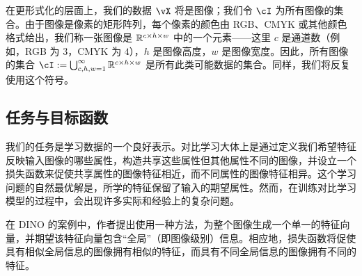 \documentclass[../../book-main.tex]{subfiles}
\begin{document}
在更形式化的层面上，我们的数据 \(\vX\) 将是图像；我们令 \(\cI\) 为所有图像的集合。由于图像是像素的矩形阵列，每个像素的颜色由 RGB、CMYK 或其他颜色格式给出，我们称一张图像是 \(\mathbb{R}^{c \times h \times w}\) 中的一个元素——这里 \(c\) 是通道数（例如，RGB 为 \(3\)，CMYK 为 \(4\)），\(h\) 是图像高度，\(w\) 是图像宽度。因此，所有图像的集合 \(\cI := \bigcup_{c, h, w = 1}^{\infty}\R^{c \times h \times w}\) 是所有此类可能数据的集合。同样，我们将反复使用这个符号。


\subsection{任务与目标函数} \label{sub:contrastive_learning_objective}

我们的任务是学习数据的一个良好表示。对比学习大体上是通过定义我们希望特征反映输入图像的哪些属性，构造共享这些属性但其他属性不同的图像，并设立一个损失函数来促使共享属性的图像特征相近，而不同属性的图像特征相异。这个学习问题的自然最优解是，所学的特征保留了输入的期望属性。然而，在训练对比学习模型的过程中，会出现许多实际和经验上的复杂问题。

在 DINO 的案例中，作者提出使用一种方法，为整个图像生成一个单一的特征向量，并期望该特征向量包含“全局”（即图像级别）信息。相应地，损失函数将促使具有相似全局信息的图像拥有相似的特征，而具有不同全局信息的图像拥有不同的特征。
\end{document}
